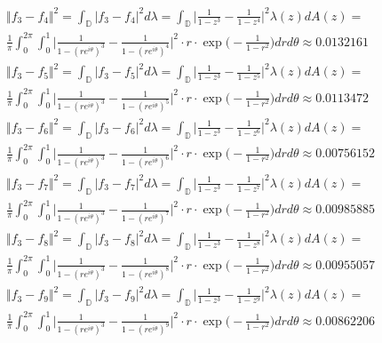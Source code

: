 \documentclass[12pt]{article}
\begin{document}
\begin{align}
& \Vert f_3 - f_4 \Vert^2 = \int_\mathbb{D} \vert f_3 - f_4 \vert^2 d\lambda = \int_\mathbb{D} \bigg\vert \frac{1}{1-z^3} - \frac{1}{1-z^4} \bigg\vert^2 \lambda(z) dA(z) = \\
& \frac{1}{\pi} \int_0^{2\pi} \int_0^1 \bigg \vert \frac{1}{1-(re^{i\theta})^3} - \frac{1}{1-(re^{i\theta})^4} \bigg \vert^2 \cdot r \cdot \exp\bigg(-\frac{1}{1-r^2}\bigg)dr d\theta \approx 0.0132161 \\
& \Vert f_3 - f_5 \Vert^2 = \int_\mathbb{D} \vert f_3 - f_5 \vert^2 d\lambda = \int_\mathbb{D} \bigg\vert \frac{1}{1-z^3} - \frac{1}{1-z^5} \bigg\vert^2 \lambda(z) dA(z) = \\
& \frac{1}{\pi} \int_0^{2\pi} \int_0^1 \bigg \vert \frac{1}{1-(re^{i\theta})^3} - \frac{1}{1-(re^{i\theta})^5} \bigg \vert^2 \cdot r \cdot \exp\bigg(-\frac{1}{1-r^2}\bigg)dr d\theta \approx 0.0113472 \\
& \Vert f_3 - f_6 \Vert^2 = \int_\mathbb{D} \vert f_3 - f_6 \vert^2 d\lambda = \int_\mathbb{D} \bigg\vert \frac{1}{1-z^3} - \frac{1}{1-z^6} \bigg\vert^2 \lambda(z) dA(z) = \\
& \frac{1}{\pi} \int_0^{2\pi} \int_0^1 \bigg \vert \frac{1}{1-(re^{i\theta})^3} - \frac{1}{1-(re^{i\theta})^6} \bigg \vert^2 \cdot r \cdot \exp\bigg(-\frac{1}{1-r^2}\bigg)dr d\theta \approx 0.00756152 \\
& \Vert f_3 - f_7 \Vert^2 = \int_\mathbb{D} \vert f_3 - f_7 \vert^2 d\lambda = \int_\mathbb{D} \bigg\vert \frac{1}{1-z^3} - \frac{1}{1-z^7} \bigg\vert^2 \lambda(z) dA(z) = \\
& \frac{1}{\pi} \int_0^{2\pi} \int_0^1 \bigg \vert \frac{1}{1-(re^{i\theta})^3} - \frac{1}{1-(re^{i\theta})^7} \bigg \vert^2 \cdot r \cdot \exp\bigg(-\frac{1}{1-r^2}\bigg)dr d\theta \approx 0.00985885 \\
& \Vert f_3 - f_8 \Vert^2 = \int_\mathbb{D} \vert f_3 - f_8 \vert^2 d\lambda = \int_\mathbb{D} \bigg\vert \frac{1}{1-z^3} - \frac{1}{1-z^8} \bigg\vert^2 \lambda(z) dA(z) = \\
& \frac{1}{\pi} \int_0^{2\pi} \int_0^1 \bigg \vert \frac{1}{1-(re^{i\theta})^3} - \frac{1}{1-(re^{i\theta})^8} \bigg \vert^2 \cdot r \cdot \exp\bigg(-\frac{1}{1-r^2}\bigg)dr d\theta \approx 0.00955057 \\
& \Vert f_3 - f_9 \Vert^2 = \int_\mathbb{D} \vert f_3 - f_9 \vert^2 d\lambda = \int_\mathbb{D} \bigg\vert \frac{1}{1-z^3} - \frac{1}{1-z^9} \bigg\vert^2 \lambda(z) dA(z) = \\
& \frac{1}{\pi} \int_0^{2\pi} \int_0^1 \bigg \vert \frac{1}{1-(re^{i\theta})^3} - \frac{1}{1-(re^{i\theta})^9} \bigg \vert^2 \cdot r \cdot \exp\bigg(-\frac{1}{1-r^2}\bigg)dr d\theta \approx 0.00862206 \\

\end{align}
\end{document}
